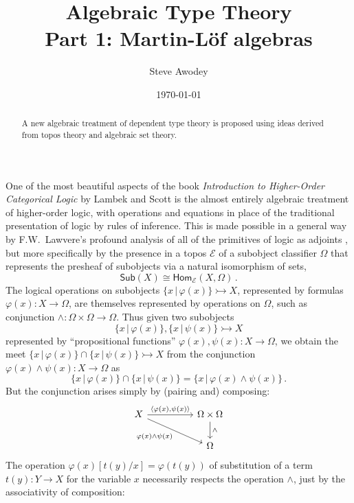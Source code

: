 \documentclass[12pt,reqno]{amsart}
\newcommand{\EE}{\ensuremath{\mathcal{E}}}
\newcommand{\Hom}{\ensuremath{\mathsf{Hom}}}
\newcommand{\mono}{\ensuremath{\rightarrowtail}}
\renewcommand{\to}{\ensuremath{\rightarrow}}
\theoremstyle{remark}
\theoremstyle{definition}
\begin{document}

\title{Algebraic Type Theory\\
Part 1: {M}artin-{L}\"of algebras}
\author{Steve Awodey}
\date{\today}

\begin{abstract}
A new algebraic treatment of dependent type theory is proposed using ideas derived from topos theory and algebraic set theory.
\end{abstract}
\maketitle

One of the most beautiful aspects of the book \emph{Introduction to Higher-Order Categorical Logic} by Lambek and Scott is the almost entirely algebraic treatment of higher-order logic, with operations and equations in place of the traditional presentation of logic by rules of inference.   This is made possible in a general way by F.W.\ Lawvere's profound analysis of all of the primitives of logic as adjoints \cite{Lawvere:adjointness}, but more specifically by the presence in a topos $\EE$ of a subobject classifier $\Omega$ that represents the presheaf of subobjects via a natural isomorphism of sets,
\[
\mathsf{Sub}(X) \cong \Hom_{\EE}(X, \Omega)\,.
\]
The logical operations on subobjects $\{x\,|\, \varphi(x)\} \mono X$, represented by formulas $\varphi(x) : X \to \Omega$, are themselves represented by operations on $\Omega$, such as conjunction $\wedge : \Omega \times \Omega \to \Omega$.  Thus given two subobjects $$\{x\,|\, \varphi(x)\} ,  \{x\,|\, \psi(x)\} \mono X $$ 
represented by ``propositional functions'' $\varphi(x), \psi(x) : X \to \Omega$, we obtain the meet $\{x\,|\, \varphi(x)\}\cap \{x\,|\, \psi(x)\} \mono X $ from the conjunction $\varphi(x)\wedge\psi(x) : X \to \Omega$ as 
\[
\{x\,|\, \varphi(x)\}\cap \{x\,|\, \psi(x)\} = \{x\,|\, \varphi(x) \wedge \psi(x)\} \,.
\]
But the conjunction arises simply by (pairing and) composing:
\begin{equation*}
\begin{tikzcd}
 X \ar[rr, "{\langle \varphi(x), \psi(x) \rangle}" ] \ar[rrd,swap,  "\varphi(x)\wedge\psi(x)"] && \Omega \times \Omega \ar[d, "\wedge"] \\
 && \Omega 
\end{tikzcd}
\end{equation*}
The operation $\varphi(x)[t(y)/x] = \varphi(t(y))$ of substitution of a term $t(y) : Y\to X$ for the variable $x$ necessarily respects the operation $\wedge$, just by the associativity of composition:
\end{document}
